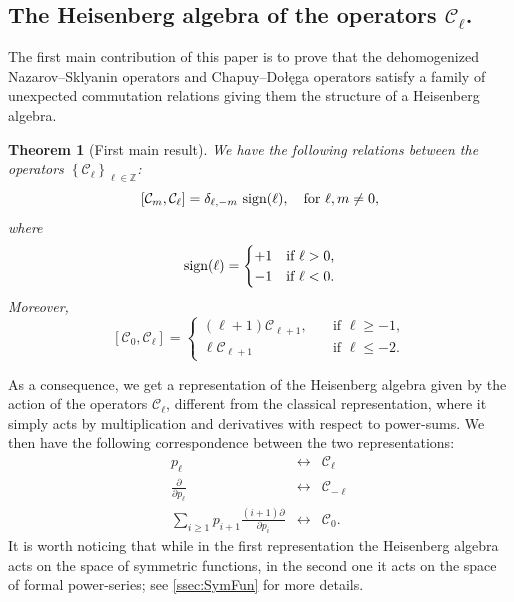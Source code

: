 \documentclass[12pt]{amsart}
\newtheorem{thm}{Theorem}[section]
\theoremstyle{remark}
\newcommand{\C}{\mathcal C}
\newcommand{\ZZ}{\mathbb Z}
\begin{document}
\subsection{The Heisenberg algebra of the  operators \texorpdfstring{$\C_\ell$}{Cl}.}
The first main contribution of this paper is to prove that the dehomogenized Nazarov--Sklyanin operators and Chapuy--Do\l{}e\k{}ga operators satisfy a family of unexpected commutation relations giving them the structure of a Heisenberg algebra.
\begin{thm}[First main result]\label{thm:commutation_relations}
    We have the following relations between the operators $\left\{\C_\ell\right\}_{\ell\in \ZZ}$:
    $$[\C_m,\C_\ell]=\delta_{\ell,-m}\ \textup{sign}(\ell), \quad\text{for $\ell,m\neq  0$},$$
    where 
    $$\textup{sign}(\ell)=\begin{cases}
        +1 & \text{if $\ell>0$,}\\
        -1 & \text{if $\ell<0$.}
    \end{cases}$$
    Moreover,
    \begin{equation}\label{eq:commutation_relations_C0}
      [\C_0,\C_\ell]=
      \begin{cases}
      (\ell+1)\C_{\ell+1}, &\quad\text{if $\ell\geq  -1$},  \\
      \ell\C_{\ell+1}     & \quad\text{if $\ell\leq  -2$}.    
      \end{cases}
    \end{equation}
\end{thm}
As a consequence, we get a representation of the Heisenberg algebra given by the action of the operators $\C_\ell$, different from the classical representation, where it simply acts by multiplication and derivatives with respect to power-sums. We then have the following correspondence between the two representations:
$$\begin{array}{ccc}
    p_\ell
    &\longleftrightarrow &\C_\ell\\
   \frac{\partial}{\partial p_\ell}
   &\longleftrightarrow &\C_{-\ell}\\
   \sum_{i\geq 1}p_{i+1}\frac{(i+1)\partial}{\partial p_i}
   &\longleftrightarrow &\C_0.
\end{array}$$
It is worth noticing that while in the first representation the Heisenberg algebra acts on the space of symmetric functions, in the second one it acts on the space of formal power-series; see \cref{ssec:SymFun} for more details. 
\end{document}
